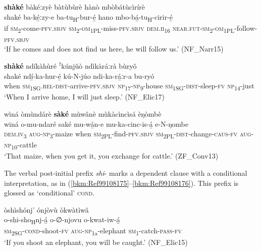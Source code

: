 \ea
\label{bkm:Ref490824802}
\textbf{shàké} bàkéːzyè bàtùbùrè hànò mbòbátùcìrírè\\
\gll shaké  ba-ké̲ːzy-e    ba-tu\textsubscript{H}-bur-é̲ hano     mbo-bá̲-tu\textsubscript{H}-cirir-é̲ \\
if  \textsc{sm}\textsubscript{2}-come-\textsc{pfv}.\textsc{sbjv}  \textsc{sm}\textsubscript{2}-\textsc{om}\textsubscript{1PL\-}-miss-\textsc{pfv}.\textsc{sbjv}
\textsc{dem}.\textsc{ii}\textsubscript{16} \textsc{near}.\textsc{fut}-\textsc{sm}\textsubscript{2}-\textsc{om}\textsubscript{1PL}-follow-\textsc{pfv}.\textsc{sbjv}\\
\glt ‘If he comes and does not find us here, he will follow us.’ (NF\_Narr15)
\z

\ea
\label{bkm:Ref490824803}
\textbf{shàké} ndíkàhùré ꜝkúnjûò ndìkàráːrà bùryô\\
\gll shaké  ndí̲-ka-hur-é̲        kú-N-júo ndi-ka-rá̲ːr-a      bu-ryó \\
when  \textsc{sm}\textsubscript{1SG}.\textsc{rel}-\textsc{dist}-arrive-\textsc{pfv}.\textsc{sbjv}  \textsc{np}\textsubscript{17}-\textsc{np}\textsubscript{9}-house
\textsc{sm}\textsubscript{1SG}-\textsc{dist}-sleep-\textsc{fv}  \textsc{np}\textsubscript{14}-just\\
\glt ‘When I arrive home, I will just sleep.’ (NF\_Elic17)
\z

\ea
\label{bkm:Ref490824804}
wìná òmùndárè \textbf{sàké} mùwânè mùkàcìncìsá èŋòmbè\\
\gll winá    o-mu-ndaré    saké  mu-wá̲n-e mu-ka-cinc-is-á̲      e-N-ŋombe \\
\textsc{dem}.\textsc{iv}\textsubscript{3}  \textsc{aug}-\textsc{np}\textsubscript{3}-maize  when  \textsc{sm}\textsubscript{2PL}-find-\textsc{pfv}.\textsc{sbjv}
\textsc{sm}\textsubscript{2PL}-\textsc{dist}-change-\textsc{caus}-\textsc{fv}  \textsc{aug}-\textsc{np}\textsubscript{10}-cattle\\
\glt ‘That maize, when you get it, you exchange for cattle.’ (ZF\_Conv13)
\z

The verbal post-initial prefix \textit{shi}- marks a dependent clause with a conditional interpretation, as in (\ref{bkm:Ref99108175}--\ref{bkm:Ref99108176}). This prefix is glossed as ‘conditional’ \textsc{cond}.

\ea
\label{bkm:Ref99108175}
òshìshónj’ ónjòvù òkwàtìwâ\\
\gll o-shi-sho\textsubscript{H}nj-á̲    o-∅-njovu    o-kwat-iw-á̲\\
\textsc{sm}\textsubscript{2SG}-\textsc{cond}-shoot-\textsc{fv}  \textsc{aug}-\textsc{np}\textsubscript{1a}-elephant  \textsc{sm}\textsubscript{1}-catch-\textsc{pass}-\textsc{fv}\\
\glt ‘If you shoot an elephant, you will be caught.’ (NF\_Elic15)
\z

